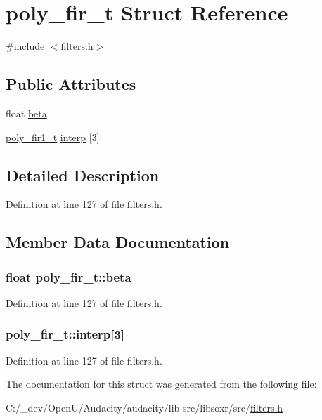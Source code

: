 \hypertarget{structpoly__fir__t}{}\section{poly\+\_\+fir\+\_\+t Struct Reference}
\label{structpoly__fir__t}


{\ttfamily \#include $<$filters.\+h$>$}

\subsection*{Public Attributes}
\begin{DoxyCompactItemize}
\item 
float \hyperlink{structpoly__fir__t_a2f1a41f9361f4a4d34431121d82c2175}{beta}
\item 
\hyperlink{structpoly__fir1__t}{poly\+\_\+fir1\+\_\+t} \hyperlink{structpoly__fir__t_aab73e9911d48977c9603fa76340e3563}{interp} \mbox{[}3\mbox{]}
\end{DoxyCompactItemize}


\subsection{Detailed Description}


Definition at line 127 of file filters.\+h.



\subsection{Member Data Documentation}
\subsubsection[{\texorpdfstring{beta}{beta}}]{\setlength{\rightskip}{0pt plus 5cm}float poly\+\_\+fir\+\_\+t\+::beta}\hypertarget{structpoly__fir__t_a2f1a41f9361f4a4d34431121d82c2175}{}\label{structpoly__fir__t_a2f1a41f9361f4a4d34431121d82c2175}


Definition at line 127 of file filters.\+h.

\subsubsection[{\texorpdfstring{interp}{interp}}]{ poly\+\_\+fir\+\_\+t\+::interp\mbox{[}3\mbox{]}}\hypertarget{structpoly__fir__t_aab73e9911d48977c9603fa76340e3563}{}\label{structpoly__fir__t_aab73e9911d48977c9603fa76340e3563}


Definition at line 127 of file filters.\+h.



The documentation for this struct was generated from the following file\+:\begin{DoxyCompactItemize}
\item 
C\+:/\+\_\+dev/\+Open\+U/\+Audacity/audacity/lib-\/src/libsoxr/src/\hyperlink{filters_8h}{filters.\+h}\end{DoxyCompactItemize}
